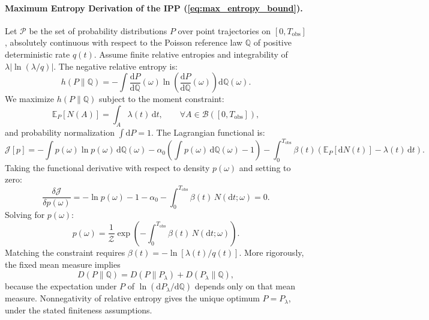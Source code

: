 \paragraph{Maximum Entropy Derivation of the IPP
(\cref{eq:max_entropy_bound}).}
Let $\mathcal{P}$ be the set of probability distributions $P$ over
point trajectories
on $[0, T_{\mathrm{obs}}]$, absolutely continuous with respect to the
Poisson reference law $\mathbb{Q}$ of positive deterministic rate $q(t)$.
Assume finite relative entropies and integrability of
$\lambda|\ln(\lambda/q)|$. The negative relative entropy is:
\begin{equation}
  h(P \parallel \mathbb{Q}) = -\int
  \frac{\mathrm{d}P}{\mathrm{d}\mathbb{Q}}(\omega) \ln\left(
  \frac{\mathrm{d}P}{\mathrm{d}\mathbb{Q}}(\omega) \right)
  \mathrm{d}\mathbb{Q}(\omega).
\end{equation}
We maximize $h(P \parallel \mathbb{Q})$ subject to the moment constraint:
\begin{equation}
  \mathbb{E}_P[N(A)] = \int_A \lambda(t)\,\mathrm{d}t, \qquad
  \forall A \in \mathcal{B}([0, T_{\mathrm{obs}}]),
\end{equation}
and probability normalization $\int \mathrm{d}P = 1$. The Lagrangian
functional is:
\begin{equation}
  \mathcal{J}[p] = -\int p(\omega)\ln
  p(\omega)\,\mathrm{d}\mathbb{Q}(\omega) - \alpha_0 \left(\int
  p(\omega)\,\mathrm{d}\mathbb{Q}(\omega) - 1\right) -
  \int_0^{T_{\mathrm{obs}}}
  \beta(t)\left(\mathbb{E}_P[\mathrm{d}N(t)] - \lambda(t)\,\mathrm{d}t\right).
\end{equation}
Taking the functional derivative with respect to density $p(\omega)$
and setting to zero:
\begin{equation}
  \frac{\delta\mathcal{J}}{\delta p(\omega)} = -\ln p(\omega) - 1 -
  \alpha_0 - \int_0^{T_{\mathrm{obs}}} \beta(t)\,N(\mathrm{d}t; \omega) = 0.
\end{equation}
Solving for $p(\omega)$:
\begin{equation}
  p(\omega) = \frac{1}{\mathcal{Z}} \exp\left(
  -\int_0^{T_{\mathrm{obs}}} \beta(t)\,N(\mathrm{d}t; \omega) \right).
\end{equation}
Matching the constraint requires $\beta(t)=-\ln[\lambda(t)/q(t)]$.
More rigorously, the fixed mean measure implies
\begin{equation}
  D(P\parallel\mathbb{Q})
  =D(P\parallel P_\lambda)+D(P_\lambda\parallel\mathbb{Q}),
\end{equation}
because the expectation under $P$ of
$\ln(\mathrm{d}P_\lambda/\mathrm{d}\mathbb{Q})$
depends only on that mean measure. Nonnegativity of relative entropy gives
the unique optimum $P=P_\lambda$, under the stated finiteness assumptions.

